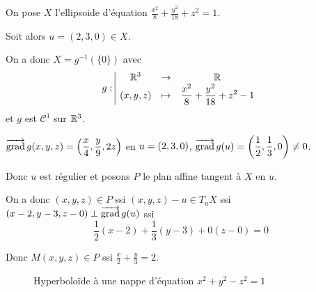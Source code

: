 \begin{exemple}
    On pose $X$ l'ellipsoide d'équation $\displaystyle \frac{x^2} 8 + \frac{y^2}{18} + z^2 = 1$.

    Soit alors $u = (2, 3, 0) \in X$. 

    On a donc $X = g^{-1}(\{0\})$ avec 
    $$g: \space \begin{array}{|ccc} \displaystyle \mathbb{R}^3 & \to & \displaystyle \mathbb{R} \\ \displaystyle (x, y, z) & \mapsto & \displaystyle \frac{x^2} 8 + \frac{y^2}{18} + z^2 - 1 \end{array}$$
    et $g$ est $\mathscr C^1$ sur $\mathbb{R}^3$. 

    $\displaystyle \overrightarrow{\operatorname{grad}} \, g (x, y, z) = \left( \frac{x} 4, \frac{y} 9, 2z \right)$ en 
    $\displaystyle u = (2, 3, 0)$, $\displaystyle \overrightarrow{\operatorname{grad}} \, g(u) = \left( \frac 1 2, \frac 1 3, 0 \right) \neq 0$.

    Donc $u$ est régulier et posons $P$ le plan affine tangent à $X$ en $u$.

    On a donc $(x, y, z) \in P$ ssi $(x, y, z) - u \in T_uX$ ssi $(x - 2, y - 3, z - 0) \perp \overrightarrow{\operatorname{grad}} \, g(u)$ ssi
    $$\frac 1 2 (x - 2) + \frac 1 3 (y - 3) + 0 (z - 0) = 0$$

    Donc $M (x, y, z) \in P$ ssi $\displaystyle \frac x 2 + \frac y 3 = 2$.
\end{exemple}

\begin{figure}[h]
\begin{center}

\end{center}
\caption{Hyperboloïde à une nappe d'équation $x^2 + y^2 - z^2 = 1$}
\end{figure}

